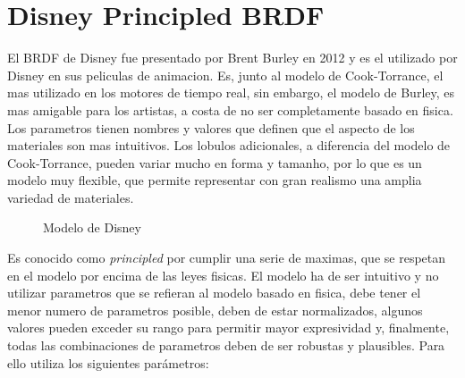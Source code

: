 


\section{Disney Principled BRDF}

El BRDF de Disney fue presentado por Brent Burley en 2012 y es el utilizado por Disney en sus peliculas de animacion. Es,
junto al modelo de Cook-Torrance, el mas utilizado en los motores de tiempo real, sin embargo, el modelo de Burley, es mas
amigable para los artistas, a costa de no ser completamente basado en fisica. Los parametros tienen nombres y valores que
definen que el aspecto de los materiales son mas intuitivos. Los lobulos adicionales, a diferencia del modelo de Cook-Torrance,
pueden variar mucho en forma y tamanho, por lo que es un modelo muy flexible, que permite representar con gran realismo una
amplia variedad de materiales.\\

\begin{figure}[H]
    \vspace{0.5cm}
    \centering
    \caption{Modelo de Disney}
\end{figure}

Es conocido como \textit{principled} por cumplir una serie de maximas, que se respetan en el modelo por encima de las leyes fisicas.
El modelo ha de ser intuitivo y no utilizar parametros que se refieran al modelo basado en fisica, debe tener el menor
numero de parametros posible, deben de estar normalizados, algunos valores pueden exceder su rango para permitir mayor
expresividad y, finalmente, todas las combinaciones de parametros deben de ser robustas y plausibles. Para ello utiliza los
siguientes par\'ametros:

